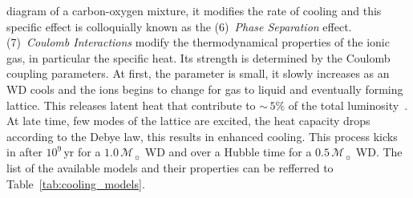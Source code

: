 \documentclass[fleqn,usenatbib]{rasti}
\newcommand{\msun}{\mathcal{M}_{\sun}}
\begin{document}
diagram of a carbon-oxygen mixture, it modifies the rate of cooling and this
specific effect is colloquially known as the (6)~\textit{Phase Separation}
effect. (7)~\textit{Coulomb Interactions} modify the thermodynamical
properties of the ionic gas, in particular the specific heat. Its strength is
determined by the Coulomb coupling parameters. At first, the parameter is
small, it slowly increases as an WD cools and the ions begins to change for
gas to liquid and eventually forming lattice. This releases latent heat that
contribute to $\sim$\,$5\%$ of the total luminosity~\citep{1976A&A....51..383S}.
At late time, few modes of the lattice are excited, the heat capacity drops
according to the Debye law, this results in enhanced cooling. This process
kicks in after $10^9$\,yr for a $1.0\,\msun$ WD and over a Hubble time for a
$0.5\,\msun$ WD. The list of the available models and their properties can be
refferred to Table~\ref{tab:cooling_models}.
\end{document}
